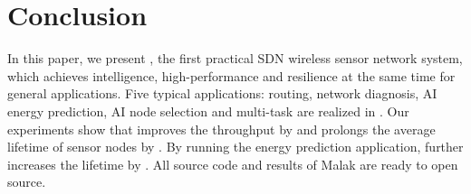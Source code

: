 \section{Conclusion}
\label{Con}

In this paper, we present {\sdn}, the first practical SDN 
wireless sensor network system,
which achieves intelligence, high-performance and 
resilience at the same time for general applications. 
Five typical applications: routing, network diagnosis, AI energy prediction, 
AI node selection and multi-task are realized in {\sdn}.
Our experiments show that {\sdn} 
improves the throughput by {\simpleTput} and prolongs the average lifetime of sensor nodes by {\simpleLife}. 
By running the energy prediction application, 
{\sdn} further increases the lifetime by {\totalLife}. 
All source code and results of Malak are ready to open source.



